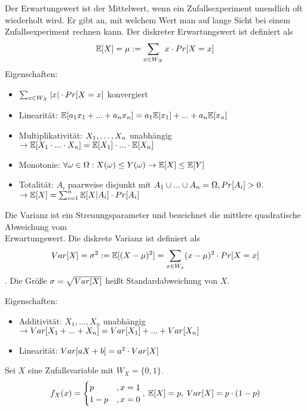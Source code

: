 \begin{definition}[Erwartungswert]
	Der Erwartungswert ist der Mittelwert, wenn  ein Zufallsexperiment unendlich oft wiederholt wird. Er gibt an, mit welchem Wert man auf lange Sicht bei einem Zufallsexperiment rechnen kann.
	Der diskreter Erwartungswert ist definiert als
	\begin{align*}
		\mathbb{E}[X] = \mu := \sum_{x \in W_X} x \cdot Pr[X = x]
	\end{align*}
	Eigenschaften:
	\begin{itemize}[noitemsep]
		\item $\sum_{x \in W_X} |x| \cdot Pr[X = x]$ konvergiert
		\item Linearität: $\mathbb{E}[a_1x_1 + ... + a_nx_n] = a_1\mathbb{E}[x_1] + ... + a_n \mathbb{E}[x_n]$
		\item Multiplikativität: $X_1, \dots, X_n$ unabhängig $\rightarrow \mathbb{E}[X_1 \cdot ... \cdot X_n] = \mathbb{E}[X_1] \cdot ... \cdot \mathbb{E}[X_n] $ 
		\item Monotonie: $\forall \omega \in \Omega : X(\omega) \leq Y(\omega) \rightarrow \mathbb{E}[X] \leq \mathbb{E}[Y]$
		\item Totalität: $A_i$ paarweise disjunkt mit $A_1 \cup ... \cup A_n = \Omega, Pr[A_i] > 0$. $\rightarrow \mathbb{E}[X] = \sum_{i = 1}^n \mathbb{E}[X | A_i] \cdot Pr[A_i]$
	\end{itemize}
\end{definition}


\begin{definition}
	Die Varianz ist ein Streuungsparameter und bezeichnet die mittlere quadratische Abweichung vom \\ Erwartungswert. Die diskrete Varianz ist definiert als
	\begin{align*}
	Var[X] = \sigma^2 := \mathbb{E}[(X - \mu)^2] = \sum_{x \in W_x} (x - \mu )^2 \cdot Pr[X = x]
	\end{align*}.
	Die Größe $\sigma = \sqrt{Var[X]}$ heißt Standardabweichung von $X$.
	
	Eigenschaften:
	\begin{itemize}[noitemsep]
		\item Additivität: $X_1, ..., X_n$ unabhängig $\rightarrow Var[X_1 + ... + X_n] = Var[X_1] + ... + Var[X_n]$
		\item Linearität: $Var[aX + b] = a^2 \cdot Var[X]$
	\end{itemize}
\end{definition}

\begin{definition}
	Sei $X$ eine Zufallsvariable mit $W_X = \{0, 1\}$.
	\begin{align*}
		f_X(x) = \begin{cases} p &, x = 1 \\ 1 - p &, x = 0\end{cases}, \medspace \mathbb{E}[X] = p, \medspace Var[X] = p \cdot (1 - p)
	\end{align*}
\end{definition}

